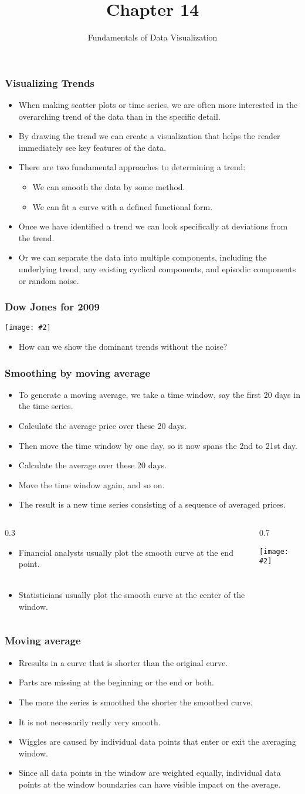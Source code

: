 \documentclass{beamer}
\author{Fundamentals of Data Visualization}
\title{Chapter 14}
\newcommand{\bi}{\begin{itemize}}
\newcommand{\li}{\item}
\newcommand{\ei}{\end{itemize}}
\newcommand{\fig}[2]{\centerline{\texttt{[image: \#2]}}}
\newcommand{\bfr}[1]{\begin{frame}[fragile]\frametitle{{ #1 }}}
\newcommand{\cola}[1]{\begin{columns}\begin{column}{#1\textwidth}}
\newcommand{\colb}[1]{\end{column}\begin{column}{#1\textwidth}}
\newcommand{\colc}{\end{column}\end{columns}}
\begin{document}
\begin{frame}
\maketitle
\end{frame}

\bfr{Visualizing Trends}
\bi
\li When making scatter plots  or time series, we are often more interested in the overarching trend of the data than in the specific detail. 
\li By drawing the trend  we can create a visualization that helps the reader immediately see key features of the data.
\li There are two fundamental approaches to determining a trend: 
\bi
\li We can  smooth the data by some method.
\li We can fit a curve with a defined functional form. 
\ei
\li Once we have identified a trend we can look specifically at deviations from the trend.
\li Or we can separate the data into multiple components, including the underlying trend, any existing cyclical components, and episodic components or random noise.
\ei
\end{frame}

\bfr{Dow Jones for 2009}
\fig{1}{dow-jones-1.png}
\bi
\li How can we show the dominant trends without the noise?
\ei
\end{frame}

\bfr{Smoothing by moving average}
\bi
\li To generate a moving average, we take a time window, say the first 20 days in the time series.
\li Calculate the average price over these 20 days. 
\li Then move the time window by one day, so it now spans the 2nd to 21st day.
\li Calculate the average over these 20 days.
\li Move the time window again, and so on.
\li The result is a new time series consisting of a sequence of averaged prices.
\ei
\end{frame}


\begin{frame}
\cola{0.3}
\bi
\li Financial analysts usually plot the smooth curve at the end point.
~\\
~\\
\li Statisticians usually plot the smooth curve at the center of the window.
\ei
\colb{0.7}
\fig{1.1}{dow-jones-moving-ave-1.png}
\colc
\end{frame}

\bfr{Moving average}
\bi
\li Rresults in a  curve that is shorter than the original curve.
\li Parts are missing at  the beginning or the end or both. 
\li The more the  series is smoothed  the shorter the smoothed curve.
\li It is not necessarily really very smooth.
\li Wiggles are caused by individual data points that enter or exit the averaging window.
\li Since all data points in the window are weighted equally, individual data points at the window boundaries can have visible impact on the average.
\ei
\end{frame}
\end{document}
